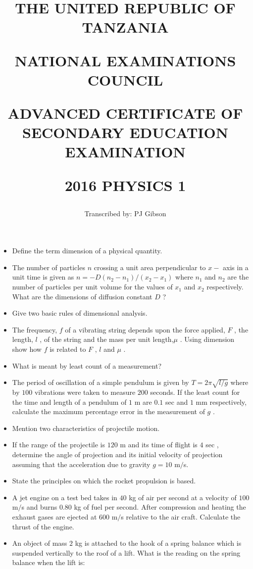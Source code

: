 \documentclass{article}
\title{THE UNITED REPUBLIC OF TANZANIA

NATIONAL EXAMINATIONS COUNCIL

ADVANCED CERTIFICATE OF SECONDARY EDUCATION EXAMINATION

\textbf{2016 PHYSICS 1}}
\author{Transcribed by:  PJ Gibson}
\begin{document}
\maketitle

\begin{itemize}
\item Define the term dimension of a physical quantity.
\item The number of particles $ n$ crossing a unit area perpendicular to $ x-$ axis in a unit time is given as $ n=-D(n_{2}-n_{1})/(x_{2}-x_{1})$ where $ n_{1}$ and $ n_{2}$ are the number of particles per unit volume for the values of $ x_{1}$ and $ x_{2}$ respectively.  What are the dimensions of diffusion constant $ D$ ?
\item Give two basic rules of dimensional analysis. 
\item The frequency, $ f$ of a vibrating string depends upon the force applied, $ F$ , the length, $ l$ , of the string and the mass per unit length,$ \mu $ . Using dimension show how $ f$ is related to $ F$ , $ l$ and $ \mu $ .
\item What is meant by least count of a measurement?
\item The period of oscillation of a simple pendulum is given by $ T=2\pi\sqrt{l/g}$ where by $ 100$ vibrations were taken to measure $ 200$ seconds. If the least count for the time and length of a pendulum of $ 1$ m are $ 0.1$ sec and $ 1$ mm respectively, calculate the maximum percentage error in the measurement of $ g$ .
\item Mention two characteristics of projectile motion.
\item If the range of the projectile is $ 120$ m and its time of flight is $ 4$ sec , determine the angle of projection and its initial velocity of projection assuming that the acceleration due to gravity $ g=10$ m$/$s. 
\item State the principles on which the rocket propulsion is based. 
\item A jet engine on a test bed takes in $ 40$ kg of air per second at a velocity of $ 100$ m$/$s  and burns $ 0.80$ kg of fuel per second. After compression and heating the exhaust gases are ejected at $ 600$ m$/$s relative to the air craft. Calculate the thrust of the engine.
\item An object of mass $ 2$ kg is attached to the hook of a spring balance which is suspended vertically to the roof of a lift.  What is the reading on the spring balance when the lift is:
 \begin{itemize}

\end{itemize}
\end{itemize}
\end{document}
